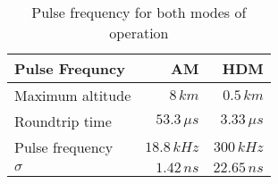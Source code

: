 \begin{table}[H]
\centering
\caption{Pulse frequency for both modes of operation}
\label{tab:f_pulse}
\begin{tabular}{|l|rr|}\hline
    \textbf{Pulse Frequncy} & AM & HDM \\
    \hline 
    Maximum altitude & $8\,km$ & $0.5\,km$ \\
    Roundtrip time & $53.3\,\mu s$ & $3.33\,\mu s$ \\
    Pulse frequency & $18.8\,kHz$ & $300\,kHz$ \\
    $\sigma$ & $1.42\,n s$ & $22.65\,n s$ \\
    \hline 
\end{tabular}
\end{table}
